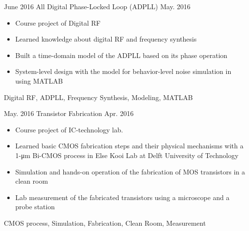 %
%
%
%
%


\begin{projects}

  \project
    {June 2016} {All Digital Phase-Locked Loop (ADPLL)}
    {May. 2016} {
                      \begin{itemize}
                        \item Course project of Digital RF
                        \item Learned knowledge about digital RF and frequency synthesis
                        \item Built a time-domain model of the ADPLL based on its phase operation
                        \item System-level design with the model for behavior-level noise simulation in using MATLAB
                      \end{itemize}
                    }
                    {Digital RF, ADPLL, Frequency Synthesis, Modeling, MATLAB}
  \emptySeparator


  \project
    {May. 2016}   {Transistor Fabrication}
    {Apr. 2016} {
                      \begin{itemize}
                        \item Course project of IC-technology lab.
                        \item Learned basic CMOS fabrication steps and their physical mechanisms with a 1-μm Bi-CMOS process in Else Kooi Lab at Delft University of Technology
                        \item Simulation and hands-on operation of the fabrication of MOS transistors in a clean room
                        \item Lab measurement of the fabricated transistors using a microscope and a probe station
                      \end{itemize}
                    }
                    {CMOS process, Simulation, Fabrication, Clean Room, Measurement}
  \emptySeparator


\end{projects}
